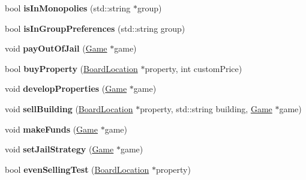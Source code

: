 \begin{DoxyCompactItemize}
\item 
\hypertarget{classPlayer_ad8abed1db7b1633eb63368a6a22e27b4}{bool {\bfseries is\-In\-Monopolies} (std\-::string $\ast$group)}\label{classPlayer_ad8abed1db7b1633eb63368a6a22e27b4}

\item 
\hypertarget{classPlayer_a79f2aed080d684d419174447a14deca5}{bool {\bfseries is\-In\-Group\-Preferences} (std\-::string group)}\label{classPlayer_a79f2aed080d684d419174447a14deca5}

\item 
\hypertarget{classPlayer_a1620c57fb7b68c7adf478b3c54fba78d}{void {\bfseries pay\-Out\-Of\-Jail} (\hyperlink{classGame}{Game} $\ast$game)}\label{classPlayer_a1620c57fb7b68c7adf478b3c54fba78d}

\item 
\hypertarget{classPlayer_a03450167ce527e0ae1ff8c650c55cdc0}{bool {\bfseries buy\-Property} (\hyperlink{classBoardLocation}{Board\-Location} $\ast$property, int custom\-Price)}\label{classPlayer_a03450167ce527e0ae1ff8c650c55cdc0}

\item 
\hypertarget{classPlayer_a227f5c1ef3ce0903c00ba7af0c8e5491}{void {\bfseries develop\-Properties} (\hyperlink{classGame}{Game} $\ast$game)}\label{classPlayer_a227f5c1ef3ce0903c00ba7af0c8e5491}

\item 
\hypertarget{classPlayer_a4c0dcd3b05c50dfc8b1206be8e1bf03d}{void {\bfseries sell\-Building} (\hyperlink{classBoardLocation}{Board\-Location} $\ast$property, std\-::string building, \hyperlink{classGame}{Game} $\ast$game)}\label{classPlayer_a4c0dcd3b05c50dfc8b1206be8e1bf03d}

\item 
\hypertarget{classPlayer_a0a710fe8eb732c7c0a017f81130cabba}{void {\bfseries make\-Funds} (\hyperlink{classGame}{Game} $\ast$game)}\label{classPlayer_a0a710fe8eb732c7c0a017f81130cabba}

\item 
\hypertarget{classPlayer_ae6c347913ba577a0ffc43d0a6b1a22d3}{void {\bfseries set\-Jail\-Strategy} (\hyperlink{classGame}{Game} $\ast$game)}\label{classPlayer_ae6c347913ba577a0ffc43d0a6b1a22d3}

\item 
\hypertarget{classPlayer_aa00933797a3d97212378d540916145a4}{bool {\bfseries even\-Selling\-Test} (\hyperlink{classBoardLocation}{Board\-Location} $\ast$property)}\label{classPlayer_aa00933797a3d97212378d540916145a4}


\end{DoxyCompactItemize}

